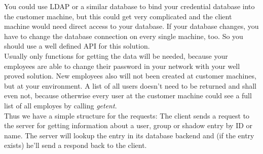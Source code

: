 You could use LDAP or a similar database to bind your credential database into
the customer machine, but this could get very complicated and the client machine
would need direct access to your database. If your database changes, you have to
change the database connection on every single machine, too. So you should use a
well defined API for this solution. \\

Usually only functions for getting the data will be needed, because your
employees are able to change their password in your network with your well
proved solution. New employees also will not been created at customer machines,
but at your environment. A list of all users doesn't need to be returned and
shall even not, because otherwise every user at the customer machine could see a
full list of all employes by calling \textit{getent}. \\

Thus we have a simple structure for the requests: The client sends a request to
the server for getting information about a user, group or shadow entry by ID or
name. The server will lookup the entry in its database backend and (if the entry
exists) he'll send a respond back to the client.
